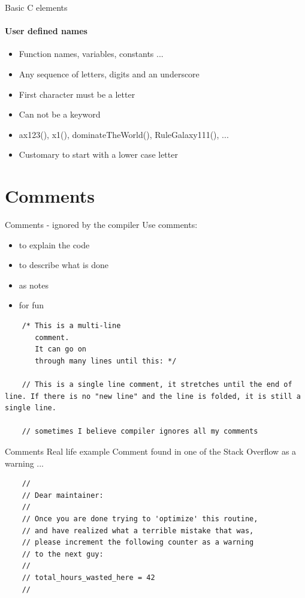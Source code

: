 \documentclass[10pt]{beamer}
\begin{document}
\begin{frame}{Basic C elements}
  \framesubtitle{User defined names}
  \begin{itemize}
    \item Function names, variables, constants ...
    \item Any sequence of letters, digits and an underscore
    \item First character must be a letter
    \item Can not be a keyword
    \item ax123(), x1(), dominateTheWorld(), RuleGalaxy111(), ...
    \item Customary to start with a lower case letter
  \end{itemize}
\end{frame}

\section{Comments}

\begin{frame}[fragile]{Comments - ignored by the compiler}
    Use comments:
    \begin{itemize}
      \item to explain the code
      \item to describe what is done
      \item as notes
      \item for fun
    \end{itemize}
    \begin{lstlisting}
    /* This is a multi-line
       comment.
       It can go on
       through many lines until this: */
   
    // This is a single line comment, it stretches until the end of line. If there is no "new line" and the line is folded, it is still a single line.
   
    // sometimes I believe compiler ignores all my comments
    \end{lstlisting}
\end{frame}

\begin{frame}[fragile]{Comments Real life example}
  Comment found in one of the Stack Overflow as a warning ...
 
  \begin{lstlisting}
    //
    // Dear maintainer:
    //
    // Once you are done trying to 'optimize' this routine,
    // and have realized what a terrible mistake that was,
    // please increment the following counter as a warning
    // to the next guy:
    //
    // total_hours_wasted_here = 42
    //
  \end{lstlisting}
\end{frame}
\end{document}
